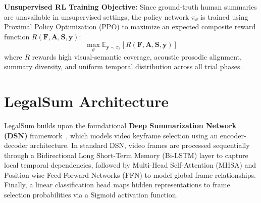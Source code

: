\documentclass[letterpaper]{article}
\begin{document}
\textbf{Unsupervised RL Training Objective:} Since ground-truth human summaries are unavailable in unsupervised settings, the policy network $\pi_\theta$ is trained using Proximal Policy Optimization (PPO) to maximize an expected composite reward function $R(\mathbf{F}, \mathbf{A}, \mathbf{S}, \mathbf{y})$:
\begin{equation}
\max_\theta \mathbb{E}_{\mathbf{y} \sim \pi_\theta} \left[ R(\mathbf{F}, \mathbf{A}, \mathbf{S}, \mathbf{y}) \right]
\end{equation}
where $R$ rewards high visual-semantic coverage, acoustic prosodic alignment, summary diversity, and uniform temporal distribution across all trial phases.

\section{LegalSum Architecture}
\label{sec:model}

LegalSum builds upon the foundational \textbf{Deep Summarization Network (DSN)} framework~\cite{zhou2018deep}, which models video keyframe selection using an encoder-decoder architecture. In standard DSN, video frames are processed sequentially through a Bidirectional Long Short-Term Memory (Bi-LSTM) layer to capture local temporal dependencies, followed by Multi-Head Self-Attention (MHSA) and Position-wise Feed-Forward Networks (FFN) to model global frame relationships. Finally, a linear classification head maps hidden representations to frame selection probabilities via a Sigmoid activation function.
\end{document}
